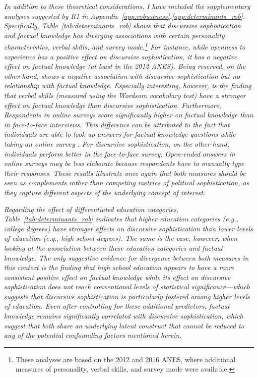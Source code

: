 \textit{In addition to these theoretical considerations, I have included the supplementary analyses suggested by R1 in Appendix~\ref{app:robustness}.\ref{app:determinants_rob}. Specifically, Table~\ref{tab:determinants_rob} shows that discursive sophistication and factual knowledge has diverging associations with certain personality characteristics, verbal skills, and survey mode.\footnote{These analyses are based on the 2012 and 2016 ANES, where additional measures of personality, verbal skills, and survey mode were available.} For instance, while openness to experience has a positive effect on discursive sophistication, it has a negative effect on factual knowledge (at least in the 2012 ANES). Being reserved, on the other hand, shows a negative association with discursive sophistication but no relationship with factual knowledge. Especially interesting, however, is the finding that verbal skills (measured using the Wordsum vocabulary test) have a stronger effect on factual knowledge than discursive sophistication. Furthermore, Respondents in online surveys score significantly higher on factual knowledge than in face-to-face interviews. This difference can be attributed to the fact that individuals are able to look up answers for factual knowledge questions while taking an online survey \citep{clifford2016cheating}. For discursive sophistication, on the other hand, individuals perform better in the face-to-face survey. Open-ended answers in online surveys may be less elaborate because respondents have to manually type their responses. These results illustrate once again that both measures should be seen as complements rather than competing metrics of political sophistication, as they capture different aspects of the underlying concept of interest.}

\textit{Regarding the effect of differentiated education categories, Table~\ref{tab:determinants_rob} indicates that higher education categories (e.g., college degrees) have stronger effects on discursive sophistication than lower levels of education (e.g., high school degrees). The same is the case, however, when looking at the association between these education categories and factual knowledge. The only suggestive evidence for divergence between both measures in this context is the finding that high school education appears to have a more consistent positive effect on factual knowledge while its effect on discursive sophistication does not reach conventional levels of statistical significance---which suggests that discursive sophistication is particularly fostered among higher levels of education. Even after controlling for these additional predictors, factual knowledge remains significantly correlated with discursive sophistication, which suggest that both share an underlying latent construct that cannot be reduced to any of the potential confounding factors mentioned herein.}

